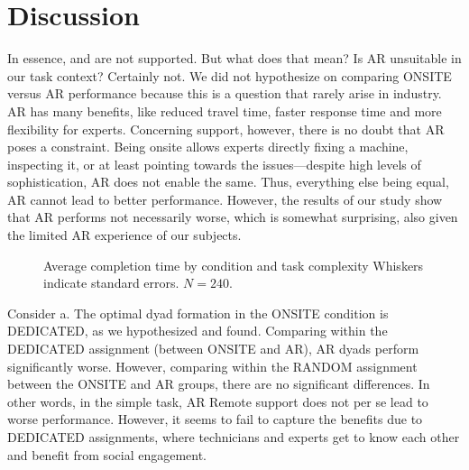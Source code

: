 \documentclass[msom,nonblindrev]{01 latex/class/informs3}
\begin{document}

\section{Discussion}

In essence,  and  are not supported. But what does that mean? Is AR unsuitable in our task context? Certainly not. We did not hypothesize on comparing ONSITE versus AR performance because this is a question that rarely arise in industry. AR has many benefits, like reduced travel time, faster response time and more flexibility for experts. Concerning support, however, there is no doubt that AR poses a constraint. Being onsite allows experts directly fixing a machine, inspecting it, or at least pointing towards the issues---despite high levels of sophistication, AR does not enable the same. Thus, everything else being equal, AR cannot lead to better performance. However, the results of our study show that AR performs not necessarily worse, which is somewhat surprising, also given the limited AR experience of our subjects.

\begin{figure}[htbp]
{Average completion time by condition and task complexity\label{fig:treatment.alternate.comparison}}
{Whiskers indicate standard errors. $N = 240.$}
\end{figure}

Consider a. The optimal dyad formation in the ONSITE condition is DEDICATED, as we hypothesized and found. Comparing within the DEDICATED assignment (between ONSITE and AR), AR dyads perform significantly worse. However, comparing within the RANDOM assignment between the ONSITE and AR groups, there are no significant differences. In other words, in the simple task, AR Remote support does not per se lead to worse performance. However, it seems to fail to capture the benefits due to DEDICATED assignments, where technicians and experts get to know each other and benefit from social engagement.
\end{document}
